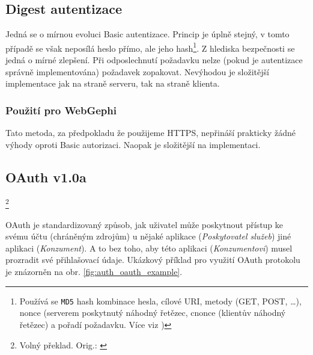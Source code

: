 \documentclass[thesis=M,czech]{FITthesis}[2014/05/6]
\begin{document}
\subsection{Digest autentizace\cite{wiki:digest}}
Jedná se o mírnou evoluci Basic autentizace. Princip je úplně stejný, v tomto případě se však neposílá heslo přímo, ale jeho hash\footnote{Používá se \texttt{MD5} hash kombinace hesla, cílové URI, metody (GET, POST, \ldots), nonce (serverem 
poskytnutý náhodný řetězec, cnonce (klientův náhodný řetězec) a pořadí požadavku. Více viz \cite{wiki:digest})}.
Z hlediska bezpečnosti se jedná o mírné zlepšení. Při odposlechnutí požadavku nelze (pokud je autentizace správně implementována) požadavek zopakovat.
Nevýhodou je složitější implementace jak na straně serveru, tak na straně klienta.

\subsubsection{Použití pro WebGephi}
Tato metoda, za předpokladu že použijeme HTTPS, nepřináší prakticky žádné výhody oproti Basic autorizaci. Naopak je složitější na implementaci.

\subsection{OAuth v1.0a}
\textit{}
\footnote{Volný překlad. Orig.: \textit{}\cite{oauth:v1}}
 
 OAuth je standardizovaný způsob, jak uživatel může poskytnout přístup ke svému účtu (chráněným zdrojům) u nějaké aplikace (\textit{Poskytovatel služeb}) jiné aplikaci (\textit{Konzument}). A
 to bez toho, aby této aplikaci (\textit{Konzumentovi}) musel prozradit své přihlašovací údaje. Ukázkový příklad pro využití OAuth protokolu je znázorněn na obr. \ref{fig:auth_oauth_example}.
\end{document}
